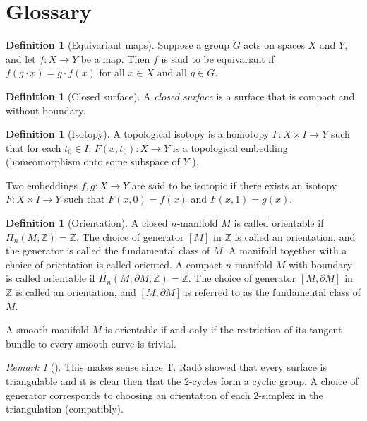\documentclass[reqno]{amsart}
\theoremstyle{definition}
\newtheorem{definition}[theorem]{Definition}
\theoremstyle{remark}
\newtheorem*{remark}{Remark}
\begin{document}
\newpage

\section{Glossary}

\begin{definition}[Equivariant maps]
    Suppose a group $G$ acts on spaces $X$ and $Y$, and let $f \colon X
    \to Y$ be a map. Then  $f$ is said to be equivariant if
    $f (g \cdot x) = g \cdot  f(x)$ for all $x \in X$ and all $g \in G$.
\end{definition}

\begin{definition}[Closed surface]
    A \textit{closed surface} is a surface that is compact
    and without boundary.
\end{definition}

\begin{definition}[Isotopy]
    A topological isotopy is a homotopy
    $F \colon X \times I \to Y$ such that for each $t_0 \in I$,
    $F(x,t_0) \colon X \to Y$ is a topological embedding (homeomorphism onto
    some subspace of $Y$ ).

    Two embeddings $f,g \colon X \to Y$ are said to be
    isotopic if there exists an isotopy $F \colon X \times I
    \to Y$ such that $F(x,0) = f(x)$ and $F(x,1) = g(x)$.
\end{definition}


\begin{definition}[Orientation]
    A closed $n$-manifold $M$ is called orientable
    if $H_n \left( M ; \mathbb{Z} \right) = \mathbb{Z}$.
    The choice of generator $\left[ M \right] $ in
    $\mathbb{Z}$ is called an orientation, and the generator
    is called the fundamental class of $M$. A manifold
    together with a choice of orientation is
    called oriented. A compact $n$-manifold $M$ with
    boundary is called orientable if
    $H_n \left( M, \partial M ; \mathbb{Z} \right) = \mathbb{Z}$.
    The choice of generator $\left[ M, \partial M \right] $ in
    $\mathbb{Z}$ is called an orientation, and
    $\left[ M, \partial M \right] $ is referred to as
    the fundamental class of $M$.

    A smooth manifold $M$ is orientable if and only if
    the restriction of its tangent bundle to every smooth
    curve is trivial.

    \begin{remark}[]
        This makes sense since T. Radó showed that every surface
        is triangulable and it is clear then that the $2$-cycles
        form a cyclic group. A choice of generator corresponds
        to choosing an orientation of each $2$-simplex in the
        triangulation (compatibly).
    \end{remark}
\end{definition}
\end{document}
